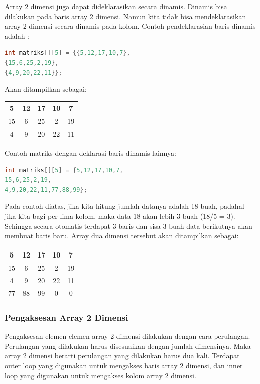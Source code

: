 Array 2 dimensi juga dapat dideklarasikan secara dinamis. Dinamis bisa
dilakukan pada baris array 2 dimensi. Namun kita tidak bisa
mendeklarasikan array 2 dimensi secara dinamis pada kolom. Contoh
pendeklarasian baris dinamis adalah :

\begin{lstlisting}[language=c++, numbers=none]
int matriks[][5] = {{5,12,17,10,7},
{15,6,25,2,19},
{4,9,20,22,11}};
\end{lstlisting}

Akan ditampilkan sebagai:

\begin{tabular}{|c|c|c|c|c|}
	\hline
	5&12&17&10&7 \\ \hline
15&6&25&2&19 \\ \hline
4&9&20&22&11 \\ \hline
\end{tabular}


Contoh matriks dengan deklarasi baris dinamis lainnya:

\begin{lstlisting}[language=c++, numbers=none]
int matriks[][5] = {5,12,17,10,7,
15,6,25,2,19,
4,9,20,22,11,77,88,99};
\end{lstlisting}

Pada contoh diatas, jika kita hitung jumlah datanya adalah 18 buah,
padahal jika kita bagi per lima kolom, maka data 18 akan lebih 3 buah
(18/5 = 3). Sehingga secara otomatis terdapat 3 baris dan sisa 3 buah
data berikutnya akan membuat baris baru. Array dua dimensi tersebut akan
ditampilkan sebagai:


\begin{tabular}{|c|c|c|c|c|}
	\hline
	5 & 12 & 17 & 10 & 7 \\ \hline
	15 & 6 & 25 & 2 & 19 \\ \hline
	4 & 9 & 20 & 22 & 11 \\ \hline
	77 & 88 & 99 & 0 & 0 \\ \hline
	
\end{tabular}

\subsubsection{Pengaksesan Array 2
Dimensi}\label{pengaksesan-array-2-dimensi}

Pengaksesan elemen-elemen array 2 dimensi dilakukan dengan cara
perulangan. Perulangan yang dilakukan harus disesuaikan dengan jumlah
dimensinya. Maka array 2 dimensi berarti perulangan yang dilakukan harus
dua kali. Terdapat outer loop yang digunakan untuk mengakses baris array
2 dimensi, dan inner loop yang digunakan untuk mengakses kolom array 2
dimensi.

